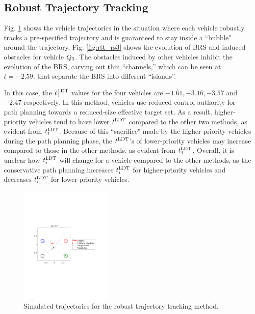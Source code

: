 \subsection{Robust Trajectory Tracking}

Fig. \ref{fig:rtt_traj} shows the vehicle trajectories in the situation where each vehicle robustly tracks a pre-specified trajectory and is guaranteed to stay inside a ``bubble" around the trajectory. Fig. \ref{fig:rtt_rs3} shows the evolution of BRS and induced obstacles for vehicle $Q_3$. The obstacles induced by other vehicles inhibit the evolution of the BRS, carving out thin “channels,” which can be seen at $t = -2.59$, that separate the BRS into different “islands”. %

In this case, the $t^\text{LDT}_i$ values for the four vehicles are $-1.61, -3.16, -3.57$ and $-2.47$ respectively. In this method, vehicles use reduced control authority for path planning towards a reduced-size effective target set. As a result, higher-priority vehicles tend to have lower $t^\text{LDT}$ compared to the other two methods, as evident from $t^\text{LDT}_1$. Because of this ``sacrifice" made by the higher-priority vehicles during the path planning phase, the $t^\text{LDT}$'s of lower-priority vehicles may increase compared to those in the other methods, as evident from $t^\text{LDT}_4$. Overall, it is unclear how $t^\text{LDT}_i$ will change for a vehicle compared to the other methods, as the conservative path planning increases $t^\text{LDT}_i$ for higher-priority vehicles and decreases $t^\text{LDT}_i$ for lower-priority vehicles.

\begin{figure}
  \centering
  \includegraphics[width=0.40\textwidth]{"fig/rtt_traj"}
  \caption{Simulated trajectories for the robust trajectory tracking method.}
  \label{fig:rtt_traj}
  \vspace{-1em}
\end{figure}

